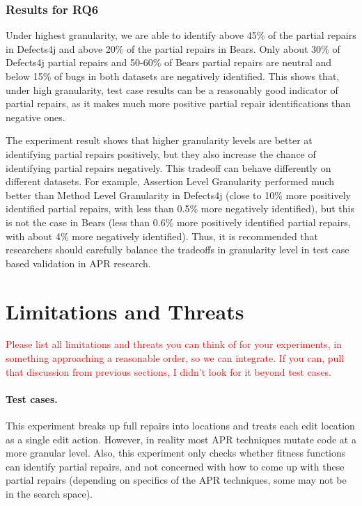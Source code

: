 \documentclass[sigconf, timestamp-false, anonymous=true]{acmart}
\newcommand\todo[1]{\textcolor{red}{#1}}
\begin{document}
\subsubsection{Results for RQ6}

Under highest granularity, we are able to identify above 45\% of the partial repairs in Defects4j
and above 20\% of the partial repairs in Bears. Only about 30\% of Defects4j partial repairs and 50-60\%
of Bears partial repairs are neutral and below 15\% of bugs in both datasets are negatively identified. This shows that, 
under high granularity, test case results can be a reasonably good indicator of partial repairs, as it makes much
more positive partial repair identifications than negative ones.
 
The experiment result shows that higher granularity levels are better at identifying partial repairs positively, 
but they also increase the chance of identifying partial repairs negatively.
This tradeoff can behave differently on different datasets. For example,
Assertion Level Granularity performed much better than Method Level Granularity
in Defects4j (close to 10\% more positively identified partial repairs, with less than
0.5\% more negatively identified), but this is not the case in Bears (less than 0.6\%
more positively identified partial repairs, with about 4\% more negatively identified).
Thus, it is recommended that researchers should 
carefully balance the tradeoffs in granularity level in test case based validation
in APR research.


\section{Limitations and Threats}

\todo{Please list all limitations and threats you can think of for your experiments, in something approaching a reasonable order, so we can integrate.  If you can, pull that discussion from previous sections, I didn't look for it beyond test cases.}

\paragraph{Test cases.}
This experiment breaks up full repairs into locations and treats each edit location as a 
single edit action. However, in reality most APR techniques mutate code at 
a more granular level.
Also, this experiment only checks whether fitness functions 
can identify partial repairs, and not concerned with how to come up with these 
partial repairs (depending on specifics of the APR 
techniques, some may not be in the search space).
\end{document}
